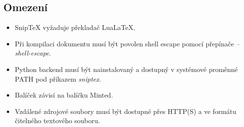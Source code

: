 \documentclass{article}
\begin{document}
\subsection*{Omezení}

\begin{itemize}
    \item Snip\TeX{} vyžaduje překladač LuaLa\TeX{}.
    
    \item Při kompilaci dokumentu musí být povolen shell escape
    pomocí přepínače \textit{--shell-escape}.

    \item Python backend musí být nainstalovaný a dostupný v systémové proměnné PATH
    pod příkazem \textit{sniptex}.

    \item Balíček závisí na balíčku Minted.

    \item Vzdálené zdrojové soubory musí být dostupné přes HTTP(S)
    a ve formátu čitelného textového souboru.
\end{itemize}



\end{document}
